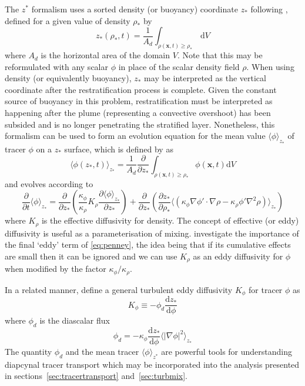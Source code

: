 \documentclass[a4paper]{article}
\begin{document}
The $z^*$ formalism uses a sorted density (or buoyancy) coordinate $z_*$ following \citet{winters1996},
defined for a given value of density $\rho_*$ by
\begin{equation}
	z_*(\rho_*, t) = \frac{1}{A_d}\int_{\rho(\bm{x},t) \ge \rho_*} \, \mathrm{d}V
\end{equation}
where $A_d$ is the horizontal area of the domain $V$. Note that this may be reformulated with any scalar $\phi$
in place of the scalar density field $\rho$. When using density (or equivalently buoyancy), $z_*$ may be
interpreted as the vertical coordinate after the restratification process is complete. Given the constant
source of buoyancy in this problem, restratification must be interpreted as happening after the plume
(representing a convective overshoot) has been subsided and is no longer penetrating the stratified layer.
Nonetheless, this formalism can be used to form an evolution equation for the mean value $\langle \phi
\rangle_{z_*}$ of tracer $\phi$ on a $z_*$ surface, which is defined by \citet{penney2020} as
\begin{equation}
	\langle \phi(z_*, t) \rangle_{z_*} = \frac{1}{A_d} \frac{\partial}{\partial z_*} \int_{\rho(\bm{x}, t) \ge
		\rho_*} \phi(\bm{x}, t) \mathrm{d}V
\end{equation}
and evolves according to
\begin{equation}
	\frac{\partial}{\partial t} \langle \phi\rangle_{z_*} = \frac{\partial}{\partial z_*} \left(
	\frac{\kappa_\phi}{\kappa_\rho}K_\rho \frac{\partial \langle \phi \rangle_{z_*}}{\partial z_*} \right)
	+ \frac{\partial}{\partial z_*}\left(\frac{\partial z_*}{\partial \rho_*} \langle (\kappa_\phi \nabla
	\phi' \cdot \nabla \rho - \kappa_\rho \phi' \nabla^2 \rho)\rangle_{z_*}\right)
	\label{eq:penney}
\end{equation}
where $K_\rho$ is the effective diffusivity for density. The concept of effective (or eddy) diffusivity is
useful as a parameterisation of mixing. \citet{penney2020} investigate the importance of the final `eddy' term
of \eqref{eq:penney}, the idea being that if its cumulative effects are small then it can be ignored and we
can use $K_\rho$ as an eddy diffusivity for $\phi$ when modified by the factor $\kappa_\phi/\kappa_\rho$.

In a related manner, \citet{winters1996} define a general turbulent eddy diffusivity $K_\phi$ for tracer
$\phi$ as
\begin{equation}
	K_\phi \equiv -\phi_d \frac{\mathrm{d}z_*}{\mathrm{d}\phi}
	\label{eq:kphi}
\end{equation}
where $\phi_d$ is the diascalar flux
\begin{equation}
	\phi_d = -\kappa_\phi \frac{\mathrm{d}z_*}{\mathrm{d}\phi} \langle \left| \nabla \phi \right|^2
	\rangle_{z_*}
\end{equation}
The quantity $\phi_d$ and the mean tracer $\langle \phi \rangle_{z^*}$ are powerful tools for understanding
diapcynal tracer transport which may be incorporated into the analysis presented in
sections~\ref{sec:tracertransport} and~\ref{sec:turbmix}.
\end{document}

